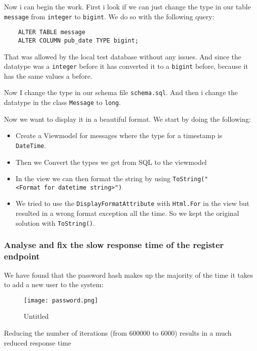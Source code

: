 Now i can begin the work. First i look if we can just change the type in our table \texttt{message} from \texttt{integer} to \texttt{bigint}. We do so with the following query:

\begin{verbatim}
    ALTER TABLE message
	ALTER COLUMN pub_date TYPE bigint;
\end{verbatim}

That was allowed by the local test database without any issues. And since the datatype was a \texttt{integer} before it has converted it to a \texttt{bigint} before, because it has the same values a before.

Now I change the type in our schema file \texttt{schema.sql}. And then i change the datatype in the class \texttt{Message} to
\texttt{long}.

Now we want to display it in a beautiful format. We start by doing the following:

\begin{itemize}
    \item Create a Viewmodel for messages where the type for a timestamp is \texttt{DateTime}.
    \item Then we Convert the types we get from SQL to the viewmodel
    \item In the view we can then format the string by using \texttt{ToString("\textless{}Format\ for\ datetime\ string\textgreater{}")}
    \item We tried to use the \texttt{DisplayFormatAttribute} with \texttt{Html.For} in the view but resulted in a wrong format exception all the time. So we kept the original solution with \texttt{ToString()}.
\end{itemize}

\subsubsection{Analyse and fix the slow response time of the register endpoint}
\label{log:analyse-and-fix-the-slow-response-time-of-the-register-endpoint}

We have found that the password hash makes up the majority of the time it takes to add a new user to the system:

\begin{figure}
\centering
\texttt{[image: password.png]}
\caption{Untitled}
\end{figure}

Reducing the number of iterations (from 600000 to 6000) results in a much reduced response time

